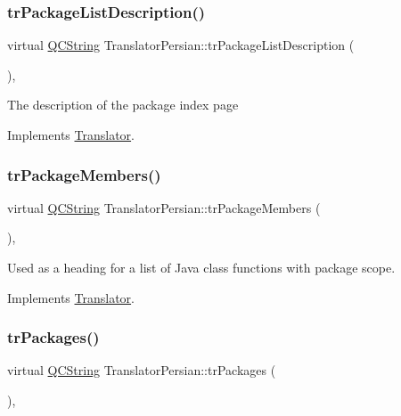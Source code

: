 \subsubsection{\texorpdfstring{trPackageListDescription()}{trPackageListDescription()}}
{\footnotesize\ttfamily virtual \mbox{\hyperlink{class_q_c_string}{Q\+C\+String}} Translator\+Persian\+::tr\+Package\+List\+Description (\begin{DoxyParamCaption}{ }\end{DoxyParamCaption})\hspace{0.3cm}{\ttfamily [inline]}, {\ttfamily [virtual]}}

The description of the package index page 

Implements \mbox{\hyperlink{class_translator}{Translator}}.

\mbox{\label{class_translator_persian_ac67f93029f8853807beda35fa393ce45}} 
\subsubsection{\texorpdfstring{trPackageMembers()}{trPackageMembers()}}
{\footnotesize\ttfamily virtual \mbox{\hyperlink{class_q_c_string}{Q\+C\+String}} Translator\+Persian\+::tr\+Package\+Members (\begin{DoxyParamCaption}{ }\end{DoxyParamCaption})\hspace{0.3cm}{\ttfamily [inline]}, {\ttfamily [virtual]}}

Used as a heading for a list of Java class functions with package scope. 

Implements \mbox{\hyperlink{class_translator}{Translator}}.

\mbox{\label{class_translator_persian_a5b382c85a1e0df2b09a9c35f3fcdb29d}} 
\subsubsection{\texorpdfstring{trPackages()}{trPackages()}}
{\footnotesize\ttfamily virtual \mbox{\hyperlink{class_q_c_string}{Q\+C\+String}} Translator\+Persian\+::tr\+Packages (\begin{DoxyParamCaption}{ }\end{DoxyParamCaption})\hspace{0.3cm}{\ttfamily [inline]}, {\ttfamily [virtual]}}

